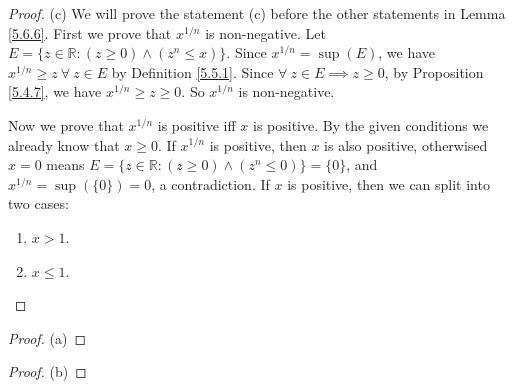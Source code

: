 \begin{proof}{(c)}
We will prove the statement (c) before the other statements in Lemma \ref{5.6.6}.
First we prove that \(x^{1 / n}\) is non-negative.
Let \(E = \{z \in \mathds{R} : (z \geq 0) \land (z^n \leq x)\}\).
Since \(x^{1 / n} = \sup(E)\), we have \(x^{1 / n} \geq z \ \forall\ z \in E\) by Definition \ref{5.5.1}.
Since \(\forall\ z \in E \implies z \geq 0\), by Proposition \ref{5.4.7}, we have \(x^{1 / n} \geq z \geq 0\).
So \(x^{1 / n}\) is non-negative.

Now we prove that \(x^{1 / n}\) is positive iff \(x\) is positive.
By the given conditions we already know that \(x \geq 0\).
If \(x^{1 / n}\) is positive, then \(x\) is also positive, otherwised \(x = 0\) means \(E = \{z \in \mathds{R} : (z \geq 0) \land (z^n \leq 0)\} = \{0\}\), and \(x^{1 / n} = \sup(\{0\}) = 0\), a contradiction.
If \(x\) is positive, then we can split into two cases:
\begin{enumerate}[label=(\Roman*)]
    \item \(x > 1\).
    \item \(x \leq 1\).
\end{enumerate}

\end{proof}

\begin{proof}{(a)}


\end{proof}

\begin{proof}{(b)}

\end{proof}

